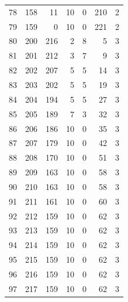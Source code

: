 \documentclass[a4paper,twoside,12pt]{book}
\begin{document}
\begin{appendices}
\begin{table}
\begin{tabular}{lrrrrrr}
		78  &    158 &        11 &        10 &               0 &             210 &         2 \\
		79  &    159 &         0 &        10 &               0 &             221 &         2 \\
		80  &    200 &       216 &         2 &               8 &               5 &         3 \\
		81  &    201 &       212 &         3 &               7 &               9 &         3 \\
		82  &    202 &       207 &         5 &               5 &              14 &         3 \\
		83  &    203 &       202 &         5 &               5 &              19 &         3 \\
		84  &    204 &       194 &         5 &               5 &              27 &         3 \\
		85  &    205 &       189 &         7 &               3 &              32 &         3 \\
		86  &    206 &       186 &        10 &               0 &              35 &         3 \\
		87  &    207 &       179 &        10 &               0 &              42 &         3 \\
		88  &    208 &       170 &        10 &               0 &              51 &         3 \\
		89  &    209 &       163 &        10 &               0 &              58 &         3 \\
		90  &    210 &       163 &        10 &               0 &              58 &         3 \\
		91  &    211 &       161 &        10 &               0 &              60 &         3 \\
		92  &    212 &       159 &        10 &               0 &              62 &         3 \\
		93  &    213 &       159 &        10 &               0 &              62 &         3 \\
		94  &    214 &       159 &        10 &               0 &              62 &         3 \\
		95  &    215 &       159 &        10 &               0 &              62 &         3 \\
		96  &    216 &       159 &        10 &               0 &              62 &         3 \\
		97  &    217 &       159 &        10 &               0 &              62 &         3 \\

\end{tabular}
\end{table}
\end{appendices}
\end{document}

